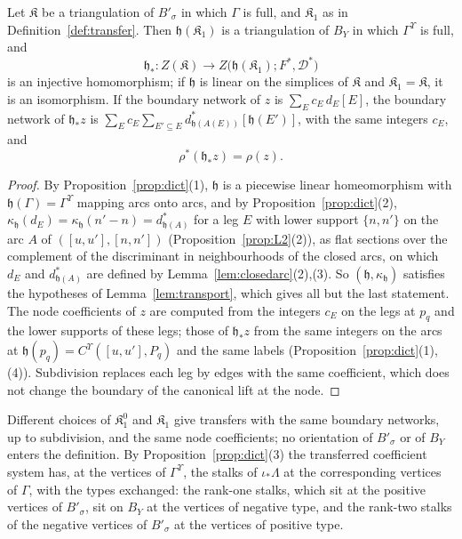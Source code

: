 \begin{proposition}\label{prop:transfer}
Let $\mathfrak K$ be a triangulation of $B'_\sigma$ in which $\Gamma$ is full, and $\mathfrak K_1$ as in
Definition~\ref{def:transfer}. Then $\mathfrak h(\mathfrak K_1)$ is a triangulation of $B_Y$ in which $\Gamma^\Upsilon$ is full, and
\[
\mathfrak h_*\colon Z(\mathfrak K)\longrightarrow Z\bigl(\mathfrak h(\mathfrak K_1);F^*,\mathcal D^*\bigr)
\]
is an injective homomorphism; if $\mathfrak h$ is linear on the simplices of $\mathfrak K$ and $\mathfrak K_1=\mathfrak K$, it is an
isomorphism. If the boundary network of $z$ is
$\sum_Ec_E\,d_E[E]$, the boundary network of $\mathfrak h_*z$ is $\sum_Ec_E\sum_{E'\subseteq E}d^*_{\mathfrak h(A(E))}[\mathfrak h(E')]$, with the same
integers $c_E$, and
\[
\rho^*(\mathfrak h_*z)=\rho(z).
\]
\end{proposition}
\begin{proof}
By Proposition~\ref{prop:dict}(1), $\mathfrak h$ is a piecewise linear homeomorphism with $\mathfrak h(\Gamma)=\Gamma^\Upsilon$ mapping arcs
onto arcs, and by Proposition~\ref{prop:dict}(2), $\kappa_{\mathfrak h}(d_E)=\kappa_{\mathfrak h}(n'-n)=d^*_{\mathfrak h(A)}$ for a leg $E$ with lower support
$\{n,n'\}$ on the arc $A$ of $([u,u'],[n,n'])$ (Proposition~\ref{prop:L2}(2)), as flat sections over the complement of the
discriminant in neighbourhoods of the closed arcs, on which $d_E$ and $d^*_{\mathfrak h(A)}$ are defined by
Lemma~\ref{lem:closedarc}(2),(3). So $(\mathfrak h,\kappa_{\mathfrak h})$ satisfies the hypotheses of
Lemma~\ref{lem:transport}, which gives all but the last statement. The node coefficients of $z$ are computed from the
integers $c_E$ on the legs at $p_q$ and the lower supports of these legs; those of $\mathfrak h_*z$ from the same integers on the arcs
at $\mathfrak h(p_q)=C^\Upsilon([u,u'],P_q)$ and the same labels (Proposition~\ref{prop:dict}(1),(4)). Subdivision replaces each leg
by edges with the same coefficient, which does not change the boundary of the canonical lift at the node.
\end{proof}

Different choices of $\mathfrak K^0_1$ and $\mathfrak K_1$ give transfers with the same boundary networks, up to
subdivision, and the same node coefficients; no orientation of $B'_\sigma$ or of $B_Y$ enters the definition. By Proposition~\ref{prop:dict}(3) the transferred coefficient system has, at
the vertices of $\Gamma^\Upsilon$, the stalks of $\iota_*\Lambda$ at the corresponding vertices of $\Gamma$, with the types
exchanged: the rank-one stalks, which sit at the positive vertices of $B'_\sigma$, sit on $B_Y$ at the vertices of negative
type, and the rank-two stalks of the negative vertices of $B'_\sigma$ at the vertices of positive type.

